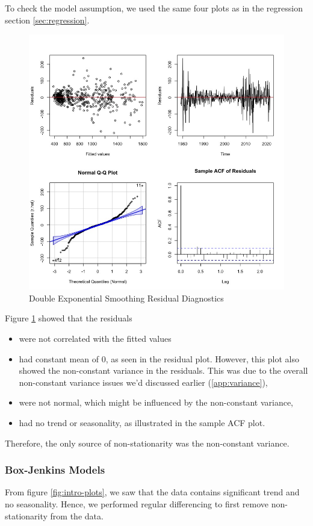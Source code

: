 \documentclass[paper=letter, fontsize=11pt]{scrartcl}
\begin{document}
To check the model assumption, we used the same four plots as in the regression section \ref{sec:regression}.

\begin{figure}[H]
    \centering
    \includegraphics[width=0.6\linewidth]{Image/smooth-res.jpeg}
    \caption{Double Exponential Smoothing Residual Diagnostics}
    \label{fig:des-res-diag}
\end{figure}

Figure \ref{fig:des-res-diag} showed that the residuals
\begin{itemize}
    \item were not correlated with the fitted values
    \item had constant mean of 0, as seen in the residual plot. However, this plot also showed the non-constant variance in the residuals. This was due to the overall non-constant variance issues we'd discussed earlier (\ref{app:variance}),
    \item were not normal, which might be influenced by the non-constant variance,
    \item had no trend or seasonality, as illustrated in the sample ACF plot.
\end{itemize}


Therefore, the only source of non-stationarity was the non-constant variance. 


\subsubsection{Box-Jenkins Models}
\label{sec:boxjenkins}

From figure \ref{fig:intro-plots}, we saw that the data contains significant trend and no seasonality. Hence, we performed regular differencing to first remove non-stationarity from the data.
\end{document}
